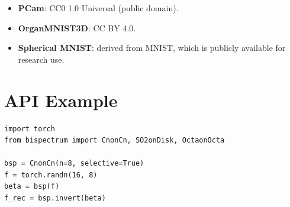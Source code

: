 \documentclass{article}
\theoremstyle{definition}
\theoremstyle{remark}
\theoremstyle{definition}
\begin{document}
\begin{itemize}[nosep]
  \item \textbf{PCam}: CC0 1.0 Universal (public domain).
  \item \textbf{OrganMNIST3D}: CC BY 4.0.
  \item \textbf{Spherical MNIST}: derived from MNIST, which is
    publicly available for research use.
\end{itemize}

\section{API Example}
\label{app:api-example}

\begin{lstlisting}
import torch
from bispectrum import CnonCn, SO2onDisk, OctaonOcta

bsp = CnonCn(n=8, selective=True)
f = torch.randn(16, 8)
beta = bsp(f)
f_rec = bsp.invert(beta)
\end{lstlisting}
\end{document}
